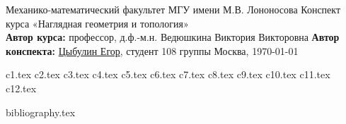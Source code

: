 \documentclass[a4paper, 12pt]{article}
\theoremstyle{plain}
\theoremstyle{definition}
\theoremstyle{remark}
\begin{document}
\begin{titlepage}
    \begin{center}
        \large Механико-математический факультет МГУ имени М.В. Лононосова
        \vfill
        \Large Конспект курса «Наглядная геометрия и топология» \bigskip \\
        \large \textbf{Автор курса:} профессор, д.ф.-м.н. Ведюшкина Виктория Викторовна
        \textbf{Автор конспекта:} \href{https://github.com/betel-git}{Цыбулин Егор}, студент 108 группы
        \vfill
        Москва, \today
    \end{center}
\end{titlepage}
\tableofcontents
\newpage


{c1.tex}
{c2.tex}
\newpage
{c3.tex}
{c4.tex}
{c5.tex}
{c6.tex}
{c7.tex}
{c8.tex}
{c9.tex}
{c10.tex}
{c11.tex}
\newpage
{c12.tex}

\newpage
{bibliography.tex}
\end{document}
